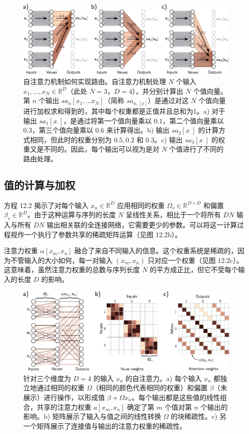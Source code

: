 \documentclass[lang=cn,newtx,10pt,scheme=chinese]{elegantbook}
\begin{document}
\begin{figure}[ht!]
\centering
\includegraphics[width=0.7\linewidth]{PDFFigures/UDLChap12PDF/TransformerRouting.pdf}
\caption{自注意力机制如何实现路由。自注意力机制处理 \(N\) 个输入 \(x_1, ..., x_N \in \mathbb{R}^D\)（此处 \(N = 3\)，\(D = 4\)），并分别计算出 \(N\) 个值向量。第 \(n\) 个输出 \(sa_n[x_1, ... x_N]\)（简称 \(sa_{n, [x]}\)）是通过对这 \(N\) 个值向量进行加权求和得到的，其中每个权重都是正值并且总和为1。a) 对于输出 \(sa_1 [x_\cdot]\)，是通过将第一个值向量乘以 \(0.1\)，第二个值向量乘以 \(0.3\)，第三个值向量乘以 \(0.6\) 来计算得出。b) 输出 \(sa_2 [x_\cdot]\) 的计算方式相同，但此时的权重分别为 \(0.5, 0.2\) 和 \(0.3\)。c) 输出 \(sa_3 [x_\cdot]\) 的权重又是不同的。因此，每个输出可以视为是对 \(N\) 个值进行了不同的路由处理。}
\end{figure}


\subsection{值的计算与加权}
方程 12.2 揭示了对每个输入 \(x_n \in \mathbb{R}^D\) 应用相同的权重 \(\Omega_v \in \mathbb{R}^{D \times D}\) 和偏置 \(\beta_v \in \mathbb{R}^D\)。由于这种运算与序列的长度 \(N\) 呈线性关系，相比于一个将所有 \(DN\) 输入与所有 \(DN\) 输出相关联的全连接网络，它需要更少的参数。可以将这一计算过程视作一个执行了参数共享的稀疏矩阵运算（见图 12.2b）。

注意力权重 \(\alpha[x_m, x_n]\) 融合了来自不同输入的信息。这个权重系统是稀疏的，因为不管输入的大小如何，每一对输入 \((x_m, x_n)\) 只对应一个权重（见图 12.2c）。这意味着，虽然注意力权重的总数与序列长度 \(N\) 的平方成正比，但它不受每个输入的长度 \(D\) 的影响。

\begin{figure}[ht!]
\centering
\includegraphics[width=0.7\linewidth]{PDFFigures/UDLChap12PDF/TransformerSA1.pdf}
\caption{针对三个维度为 \(D = 4\) 的输入 \(x_n\) 的自注意力。a) 每个输入 \(x_n\) 都独立地通过相同的权重 \(\Omega\)（相同的颜色代表相同的权重）和偏置 \(\beta\)（未展示）进行操作，以形成值 \(\beta + \Omega x_n\)。每个输出都是这些值的线性组合，共享的注意力权重 \(a[x_m, x_n]\) 确定了第 \(m\) 个值对第 \(n\) 个输出的影响。b) 矩阵展示了输入与值之间的线性转换 \(\Omega\) 的块稀疏性。c) 另一个矩阵展示了连接值与输出的注意力权重的稀疏性。}
\end{figure}
\end{document}
